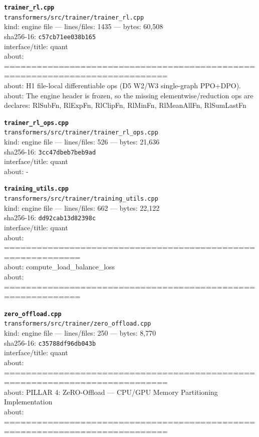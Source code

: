 \noindent\textbf{\texttt{trainer\_rl.cpp}}\\
\texttt{transformers/src/trainer/trainer\_rl.cpp}\\
kind: engine file --- lines/files: 1435 --- bytes: 60,508\\
sha256-16: \texttt{c57cb71ee038b165}\\
interface/title: quant\\
about: ============================================================================\\
about: H1 file-local differentiable ops (D5 W2/W3 single-graph PPO+DPO).\\
about: The engine header is frozen, so the missing elementwise/reduction ops are\\
declares: RlSubFn, RlExpFn, RlClipFn, RlMinFn, RlMeanAllFn, RlSumLastFn\\
\vspace*{6.0pt}

\noindent\textbf{\texttt{trainer\_rl\_ops.cpp}}\\
\texttt{transformers/src/trainer/trainer\_rl\_ops.cpp}\\
kind: engine file --- lines/files: 526 --- bytes: 21,636\\
sha256-16: \texttt{3cc47dbeb7beb9ad}\\
interface/title: quant\\
about: -\\
\vspace*{6.0pt}

\noindent\textbf{\texttt{training\_utils.cpp}}\\
\texttt{transformers/src/trainer/training\_utils.cpp}\\
kind: engine file --- lines/files: 662 --- bytes: 22,122\\
sha256-16: \texttt{dd92cab13d82398c}\\
interface/title: quant\\
about: ============================================================\\
about: compute\_load\_balance\_loss\\
about: ============================================================\\
\vspace*{6.0pt}

\noindent\textbf{\texttt{zero\_offload.cpp}}\\
\texttt{transformers/src/trainer/zero\_offload.cpp}\\
kind: engine file --- lines/files: 250 --- bytes: 8,770\\
sha256-16: \texttt{c35788df96db043b}\\
interface/title: quant\\
about: ============================================================================\\
about: PILLAR 4: ZeRO-Offload — CPU/GPU Memory Partitioning Implementation\\
about: ============================================================================\\
\vspace*{6.0pt}
\newpage

